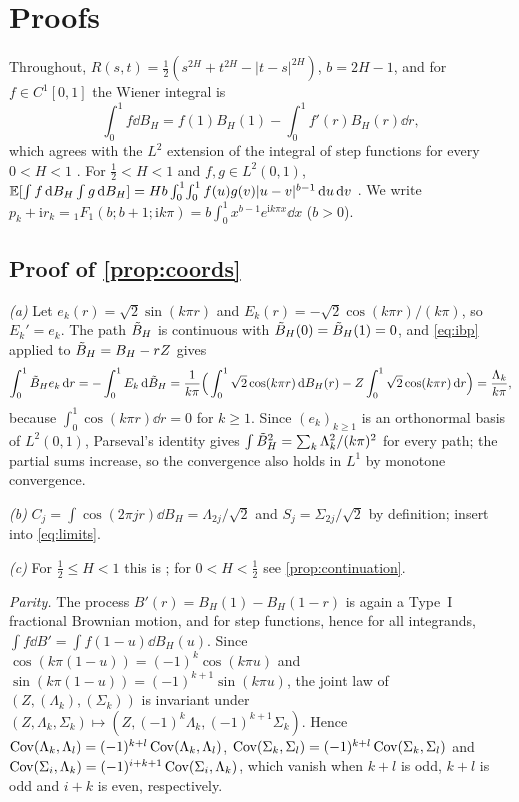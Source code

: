 \section{Proofs}\label{app:proofs}

Throughout, $R(s,t)=\frac12(s^{2H}+t^{2H}-|t-s|^{2H})$, $b=2H-1$, and for $f\in C^1[0,1]$ the Wiener integral is
\begin{equation}\label{eq:ibp}
\int_0^1f\dd B_H=f(1)B_H(1)-\int_0^1f'(r)B_H(r)\dd r ,
\end{equation}
which agrees with the $L^2$ extension of the integral of step functions for every $0<H<1$ \citep{PT00}. For
$\frac12<H<1$ and $f,g\in L^2(0,1)$, $\mathbb E[\int f\,\mathrm d B_H\int g\,\mathrm d B_H]=Hb\int_0^1\!\int_0^1f(u)g(v)|u-v|^{b-1}\,\mathrm d u\,\mathrm d v$
\citep{PT00}. We write $p_k+\mathrm ir_k={}_1F_1(b;b+1;\mathrm ik\pi)=b\int_0^1x^{b-1}e^{\mathrm ik\pi x}\dd x$ ($b>0$).

\subsection{Proof of \texorpdfstring{\cref{prop:coords}}{Proposition 1}}
\emph{(a)} Let $e_k(r)=\sqrt2\sin(k\pi r)$ and $E_k(r)=-\sqrt2\cos(k\pi r)/(k\pi)$, so $E_k'=e_k$. The path $\tilde B_H$ is
continuous with $\tilde B_H(0)=\tilde B_H(1)=0$, and \eqref{eq:ibp} applied to $\tilde B_H=B_H-rZ$ gives
\[\int_0^1\tilde B_H e_k\,\mathrm d r=-\int_0^1E_k\,\mathrm d\tilde B_H=\frac1{k\pi}\Big(\int_0^1\sqrt2\cos(k\pi r)\,\mathrm d B_H(r)-Z\int_0^1\sqrt2\cos(k\pi r)\,\mathrm d r\Big)
=\frac{\Lambda_k}{k\pi},\]
because $\int_0^1\cos(k\pi r)\dd r=0$ for $k\ge1$. Since $(e_k)_{k\ge1}$ is an orthonormal basis of $L^2(0,1)$,
Parseval's identity gives $\int\tilde B_H^2=\sum_k\Lambda_k^2/(k\pi)^2$ for every path; the partial sums increase, so the
convergence also holds in $L^1$ by monotone convergence.

\emph{(b)} $C_j=\int\cos(2\pi jr)\dd B_H=\Lambda_{2j}/\sqrt2$ and $S_j=\Sigma_{2j}/\sqrt2$ by definition; insert into
\eqref{eq:limits}.

\emph{(c)} For $\frac12\le H<1$ this is \citet[Proposition~1, closed-form Gram matrices]{AhmedCosChaos}; for $0<H<\frac12$ see
\cref{prop:continuation}.

\emph{Parity.} The process $B'(r)=B_H(1)-B_H(1-r)$ is again a Type~I fractional Brownian motion, and for step functions,
hence for all integrands, $\int f\dd B'=\int f(1-u)\dd B_H(u)$. Since $\cos(k\pi(1-u))=(-1)^k\cos(k\pi u)$ and
$\sin(k\pi(1-u))=(-1)^{k+1}\sin(k\pi u)$, the joint law of $(Z,(\Lambda_k),(\Sigma_k))$ is invariant under
$(Z,\Lambda_k,\Sigma_k)\mapsto(Z,(-1)^k\Lambda_k,(-1)^{k+1}\Sigma_k)$. Hence
$\operatorname{Cov}(\Lambda_k,\Lambda_l)=(-1)^{k+l}\operatorname{Cov}(\Lambda_k,\Lambda_l)$, $\operatorname{Cov}(\Sigma_k,\Sigma_l)=(-1)^{k+l}\operatorname{Cov}(\Sigma_k,\Sigma_l)$
and $\operatorname{Cov}(\Sigma_i,\Lambda_k)=(-1)^{i+k+1}\operatorname{Cov}(\Sigma_i,\Lambda_k)$, which vanish when $k+l$ is odd, $k+l$ is odd and
$i+k$ is even, respectively.

